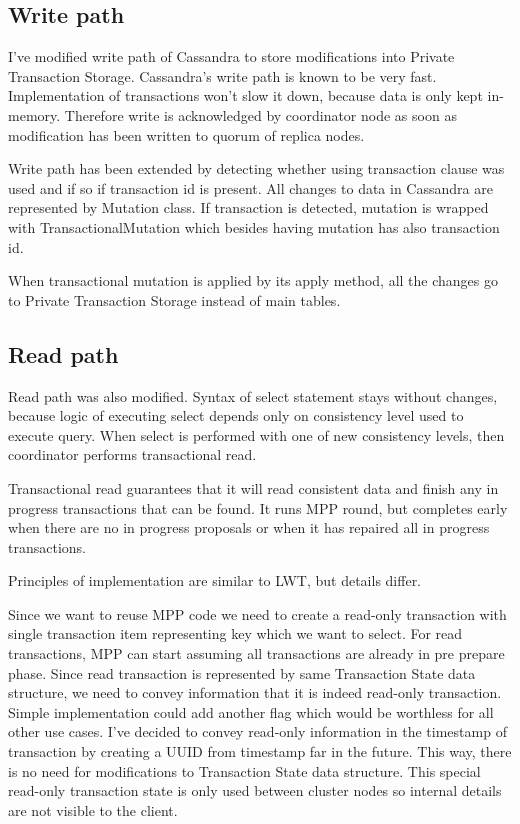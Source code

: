 \subsection{Write path}
I’ve modified write path of Cassandra to store modifications into Private Transaction Storage.
Cassandra’s write path is known to be very fast. Implementation of transactions won’t slow it down, because data is only kept in-memory. Therefore write is acknowledged by coordinator node as soon as modification has been written to quorum of replica nodes.


Write path has been extended by detecting whether using transaction clause was used and if so if transaction id is present. All changes to data in Cassandra are represented by Mutation class. If transaction is detected, mutation is wrapped with TransactionalMutation which besides having mutation has also transaction id.


When transactional mutation is applied by its apply method, all the changes go to Private Transaction Storage instead of main tables.


\subsection{Read path}
Read path was also modified. Syntax of select statement stays without changes, because logic of executing select depends only on consistency level used to execute query.  When select is performed with one of new consistency levels, then coordinator performs transactional read.


Transactional read guarantees that it will read consistent data and finish any in progress transactions that can be found. It runs MPP round, but completes early when there are no in progress proposals or when it has repaired all in progress transactions.


Principles of implementation are similar to LWT, but details differ.


Since we want to reuse MPP code we need to create a read-only transaction with single transaction item representing key which we want to select. For read transactions, MPP can start assuming all transactions are already in pre prepare phase. Since read transaction is represented by same Transaction State data structure, we need to convey information that it is indeed read-only transaction. Simple implementation could add another flag which would be worthless for all other use cases. I’ve decided to convey read-only information in the timestamp of transaction by creating a UUID from timestamp far in the future. This way, there is no need for modifications to Transaction State data structure. This special read-only transaction state is only used between cluster nodes so internal details are not visible to the client.


